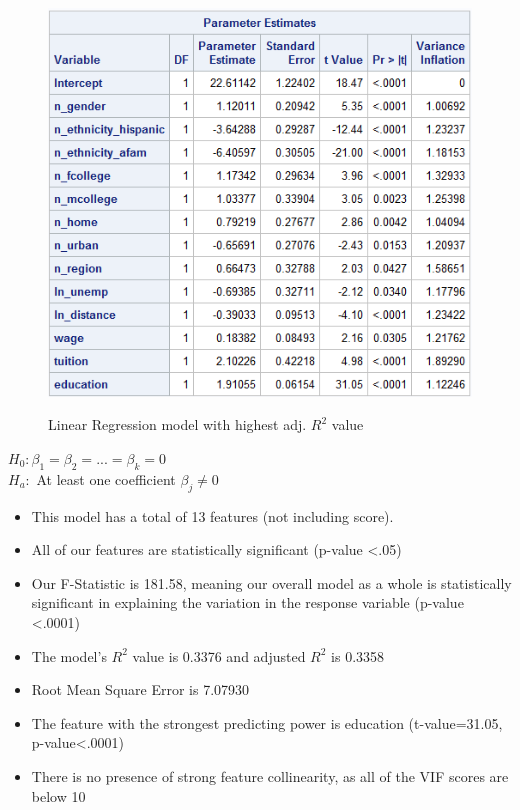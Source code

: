 \documentclass[12pt]{article}
\begin{document}
\begin{figure}[h]
\begin{minipage}[t]{0.55\textwidth}
        \includegraphics[width=\textwidth]{images/model1_b.png}
        
        \label{fig:unemp_measures}
    \end{minipage}
    \caption{Linear Regression model with highest adj. $R^{2}$ value}
    \label{fig:unemp_fig}
\end{figure}

 \large\noindent $H_{0}: \beta_1 = \beta_2 = ... = \beta_k = 0$\\
 $H_a:$ At least one coefficient $\beta_j \ne 0$ 
  \normalsize
\begin{itemize}
    \item This model has a total of 13 features (not including score).
    \item All of our features are statistically significant (p-value \textless .05)
    \item Our F-Statistic is 181.58, meaning our overall model as a whole is statistically significant in explaining the variation in the response variable (p-value \textless .0001)
    \item The model's $R^2$ value is 0.3376 and adjusted $R^2$ is 0.3358
    \item Root Mean Square Error is 7.07930
    \item The feature with the strongest predicting power is education (t-value=31.05, p-value\textless .0001)
    \item There is no presence of strong feature collinearity, as all of the VIF scores are below 10
\end{itemize}
\end{document}
